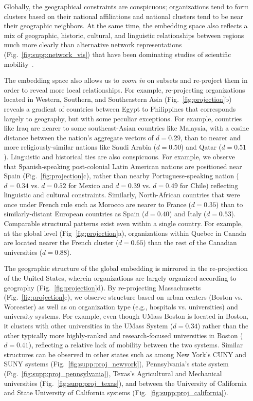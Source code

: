 \documentclass[12pt]{article} %
\begin{document}
Globally, the geographical constraints are conspicuous; organizations tend to form clusters based on their national affiliations and national clusters tend to be near their geographic neighbors. 
At the same time, the embedding space also reflects a mix of geographic, historic, cultural, and linguistic relationships between regions much more clearly than alternative network representations (Fig.~\ref{fig:supp:network_vis}) that have been dominating studies of scientific mobility~\autocite{chinchilla2018global, czaika2018globalisation}.

The embedding space also allows us to \textit{zoom in} on subsets and re-project them in order to reveal more local relationships. 
For example, re-projecting organizations located in Western, Southern, and Southeastern Asia (Fig.~\ref{fig:projection}b) reveals a gradient of countries between Egypt to Philippines that corresponds largely to geography, but with some peculiar exceptions. 
For example, countries like Iraq are nearer to some southeast-Asian countries like Malaysia, with a cosine distance between the nation's aggregate vectors of $d = 0.29$, than to nearer and more religiously-similar nations like Saudi Arabia ($d = 0.50$) and Qatar ($d = 0.51$). 
Linguistic and historical ties are also conspicuous.
For example, we observe that Spanish-speaking post-colonial Latin American nations are positioned near Spain (Fig.~\ref{fig:projection}c), rather than nearby Portuguese-speaking nation ($d = 0.34$ vs. $d = 0.52$ for Mexico and $d = 0.39$ vs. $d = 0.49$ for Chile) reflecting linguistic and cultural constraints.
Similarly, North-African countries that were once under French rule such as Morocco are nearer to France ($d =0.35$) than to similarly-distant European countries as Spain ($d = 0.40$) and Italy ($d = 0.53$). 
Comparable structural patterns exist even within a single country.
For example, at the global level (Fig~\ref{fig:projection}a), organizations within Quebec in Canada are located nearer the French cluster ($d = 0.65$) than the rest of the Canadian universities ($d = 0.88$).


The geographic structure of the global embedding is mirrored in the re-projection of the United States, wherein organizations are largely organized according to geography (Fig.~\ref{fig:projection}d).
By re-projecting Massachusetts (Fig.~\ref{fig:projection}e), we observe structure based on urban centers (Boston vs. Worcester) as well as on organization type (e.g., hospitals vs. universities) and university systems.
For example, even though UMass Boston is located in Boston, it clusters with  other universities in the UMass System ($d = 0.34$) rather than the other typically more highly-ranked and research-focused universities in Boston ($d = 0.41$), reflecting a relative lack of mobility between the two systems.
Similar structures can be observed in other states such as among New York's CUNY and SUNY systems (Fig.~\ref{fig:supp:proj_newyork}), Pennsylvania's state system (Fig.~\ref{fig:supp:proj_pennsylvania}), Texas's Agricultural and Mechanical universities (Fig.~\ref{fig:supp:proj_texas}), and between the University of California and State University of California systems (Fig.~\ref{fig:supp:proj_california}). 
\end{document}
